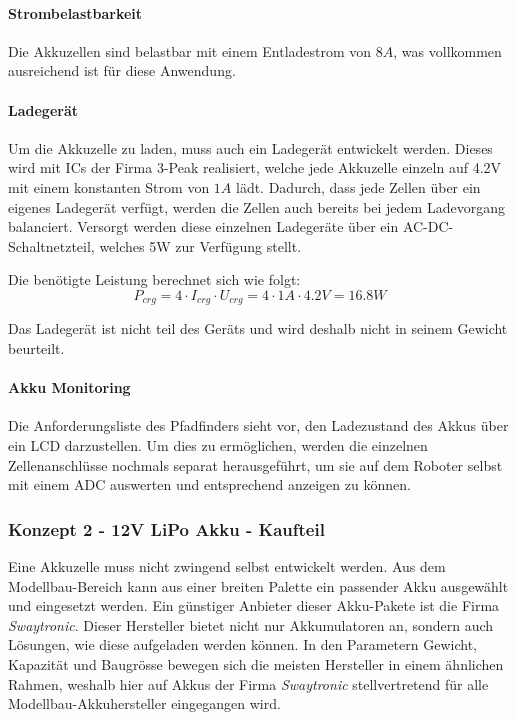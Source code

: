 \documentclass[main.tex]{subfiles} %
\begin{document}
\paragraph{Strombelastbarkeit}
Die Akkuzellen sind belastbar mit einem Entladestrom von $8A$, was vollkommen
ausreichend ist für diese Anwendung.

\paragraph{Ladegerät}
Um die Akkuzelle zu laden, muss auch ein Ladegerät entwickelt werden. Dieses
wird mit ICs der Firma 3-Peak realisiert, welche jede Akkuzelle einzeln auf
4.2V mit einem konstanten Strom von $1A$ lädt. Dadurch, dass jede Zellen über
ein eigenes Ladegerät verfügt, werden die Zellen auch bereits bei jedem
Ladevorgang balanciert. Versorgt werden diese einzelnen Ladegeräte über ein
AC-DC-Schaltnetzteil, welches 5W zur Verfügung stellt.

Die benötigte Leistung berechnet sich wie folgt:
\[
    P_{crg} = 4 \cdot I_{crg} \cdot U_{crg} =  4 \cdot 1A \cdot 4.2V = 16.8W
\]

Das Ladegerät ist nicht teil des Geräts und wird deshalb nicht in seinem
Gewicht beurteilt.

\paragraph{Akku Monitoring}
Die Anforderungsliste des Pfadfinders sieht vor, den Ladezustand des Akkus über
ein LCD darzustellen. Um dies zu ermöglichen, werden die einzelnen
Zellenanschlüsse nochmals separat herausgeführt, um sie auf dem Roboter selbst
mit einem ADC auswerten und entsprechend anzeigen zu können.

\subsubsection*{Konzept 2 - 12V LiPo Akku - Kaufteil}

Eine Akkuzelle muss nicht zwingend selbst entwickelt werden. Aus dem
Modellbau-Bereich kann aus einer breiten Palette ein passender Akku ausgewählt
und eingesetzt werden. Ein günstiger Anbieter dieser Akku-Pakete ist die Firma
\textit{Swaytronic}. Dieser Hersteller bietet nicht nur Akkumulatoren an,
sondern auch Lösungen, wie diese aufgeladen werden können. In den Parametern
Gewicht, Kapazität und Baugrösse bewegen sich die meisten Hersteller in einem
ähnlichen Rahmen, weshalb hier auf Akkus der Firma \textit{Swaytronic}
stellvertretend für alle Modellbau-Akkuhersteller eingegangen wird.
\end{document}
